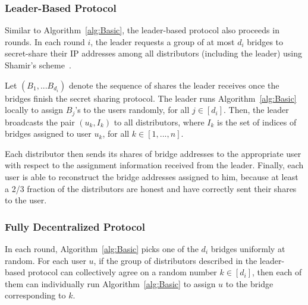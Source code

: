 \documentclass[USenglish,oneside,twocolumn]{article}
\newcommand{\algFont}{\fontsize{10}{13}\selectfont}
\newcommand{\bricks}{}
\def\bricks/{\textsf{\sfsize \mbox{TorBricks}}}
\newcommand{\sfsize}{\fontsize{0.68\baselineskip}{0.68\baselineskip}\selectfont}
\begin{document}
\subsubsection{Leader-Based Protocol} \label{sec:leader-alg}

Similar to Algorithm~\ref{alg:Basic}, the leader-based protocol also proceeds in rounds. In each round $i$, the leader requests a group of at most $d_i$ bridges to secret-share their IP addresses among all distributors (including the leader) using Shamir's scheme~\cite{shamir:how}. 

Let $(B_1,...B_{d_i})$ denote the sequence of shares the leader receives once the bridges finish the secret sharing protocol. The leader runs Algorithm~\ref{alg:Basic} locally to assign $B_j$'s to the users randomly, for all ${j \in [d_i]}$. Then, the leader broadcasts the pair $(u_k, I_k)$ to all distributors, where $I_k$ is the set of indices of bridges assigned to user $u_k$, for all $k \in [1,...,n]$.

Each distributor then sends its shares of bridge addresses to the appropriate user with respect to the assignment information received from the leader. Finally, each user is able to reconstruct the bridge addresses assigned to him, because at least a 2/3 fraction of the distributors are honest and have correctly sent their shares to the user.
%	

\subsubsection{Fully Decentralized Protocol} \label{sec:decentralized-alg}
In each round, Algorithm~\ref{alg:Basic} picks one of the $d_i$ bridges uniformly at random. For each user $u$, if the group of distributors described in the leader-based protocol can collectively agree on a random number ${k \in [d_i]}$, then each of them can individually run Algorithm~\ref{alg:Basic} to assign $u$ to the bridge corresponding to $k$. 
\end{document}

